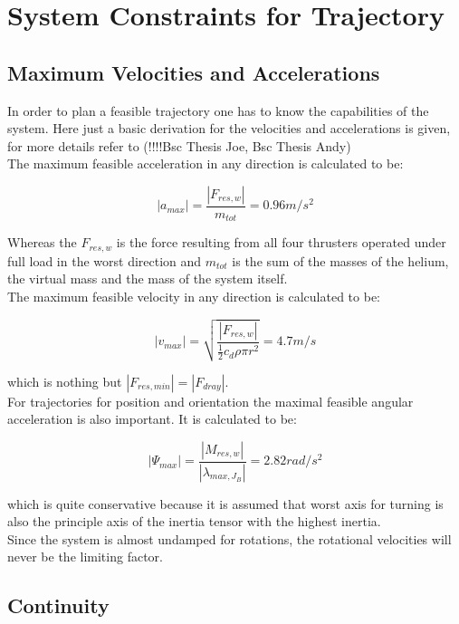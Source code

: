 \section{System Constraints for Trajectory}

\subsection{Maximum Velocities and Accelerations}
In order to plan a feasible trajectory one has to know the capabilities of the system. Here just a basic derivation for the velocities and accelerations is given, for more details refer to (!!!!Bsc Thesis Joe, Bsc Thesis Andy)\\

The maximum feasible acceleration in any direction is calculated to be:

\begin{equation}
  \left|a_{max} \right| =  \frac{\left|F_{res, w}\right|}{m_{tot}} = 0.96 m/s^2
\end{equation}

Whereas the $F_{res,w}$ is the force resulting from all four thrusters operated under full load in the worst direction and $m_{tot}$ is the sum of the masses of the helium, the virtual mass and the mass of the system itself.\\


The maximum feasible velocity in any direction is calculated to be:

\begin{equation}
\left|v_{max} \right| = \sqrt{\frac{\left|F_{res,w} \right|}{\frac{1}{2}c_d \rho \pi r^2}}=4.7 m/s
\end{equation}

which is nothing but $ \left|F_{res,min} \right| = \left|F_{dray} \right| $.\\

For trajectories for position and orientation the maximal feasible angular acceleration is also important. It is calculated to be:

\begin{equation}
  \left|\Psi_{max} \right| =  \frac{\left|M_{res,w}\right|}{\left| \lambda_{max, J_{B}} \right|} = 2.82 rad/s^2 
\end{equation}

which is quite conservative because it is assumed that worst axis for turning is also the principle axis of the inertia tensor with the highest inertia.\\

Since the system is almost undamped for rotations, the rotational velocities will never be the limiting factor.





\subsection{Continuity}







